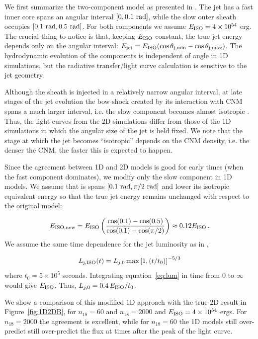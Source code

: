 \documentclass[usenatbib,fleqn]{mnras}
\begin{document}
We first summarize the two-component model as presented in
\citet{Mimica+2015}. The jet has a fast inner core spans an angular
interval $[0, 0.1\ {\rm rad}]$, while the slow outer sheath occupies
$[0.1\ {\rm rad}, 0.5\ {\rm rad}]$. For both components we assume
$E_{\rm ISO} = 4\times 10^{54}$ erg. The crucial thing to notice is
that, keeping $E_{\rm ISO}$ constant, the true jet energy depends only
on the angular interval: $E_{\rm jet} = E_{\rm ISO} (\cos\theta_{\rm
  j,min} - \cos\theta_{\rm j,max})$. The hydrodynamic evolution of the
components is independent of angle in 1D simulations, but the
radiative transfer/light curve calculation is sensitive to the jet
geometry.

Although the sheath is injected in a relatively
narrow angular interval, at late stages of the jet evolution the bow
shock created by its interaction with CNM spans a much larger interval,
i.e. the slow component becomes almost isotropic \citep[bottom two
panels in Fig. 8 in][]{Mimica+2015}. Thus, the light curves from the
2D simulations differ from those of the 1D simulations in which the
angular size of the jet is held fixed. We note that the stage at
which the jet becomes ``isotropic'' depends on the CNM density,
i.e. the denser the CNM, the faster this is expected to happen.

Since the agreement between 1D and 2D models is good for early times
(when the fast component dominates), we modify only the slow component
in 1D models. We assume that is spans $[0.1\ {\rm rad}, \pi/2\ {\rm
  rad}]$ and lower its isotropic equivalent energy so that the true
jet energy remains unchanged with respect to the original model:

\begin{equation}\label{eq:Eiso}
 E_{\rm ISO, new} = E_{\rm ISO} \left(\frac{\cos(0.1) - \cos(0.5)}{\cos(0.1) - \cos(\pi/2)}\right)\approx 0.12 E_{\rm ISO}\, .
\end{equation}
%
We assume the same time dependence for the jet luminosity as in
\citet{Mimica+2015},

\begin{equation}\label{eq:lum}
L_{\rm j, ISO}(t) = L_{j,0}\max\left[1, (t/t_0)\right]^{-5/3}
\end{equation}
%
where $t_0 = 5\times 10^5$ seconds. Integrating equation~\ref{eq:lum}
in time from $0$ to $\infty$ would give $E_{\rm ISO}$. Thus,
$L_{j,0}=0.4\, E_{\rm ISO}/t_0$. 

We show a comparison of this modified 1D approach with the true 2D
result in Figure~\ref{fig:1D2DB}, for $n_{18}=60$ and $n_{18}=2000$
and $E_{\rm ISO}=4 \times 10^{54}$ ergs. For $n_{18}=2000$ the
agreement is excellent, while for $n_{18}=60$ the 1D models still
over-predict still over-predict the flux at times after the peak of
the light curve.
\end{document}
